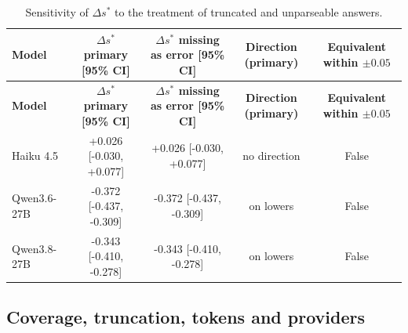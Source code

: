 \documentclass[10pt,a4paper]{article}
\begin{document}
\begin{footnotesize}
\setlength{\tabcolsep}{2pt}
\begin{longtable}{lcccc}
\caption{Sensitivity of $\Delta s^{*}$ to the treatment of truncated and unparseable answers.}\\
\toprule
\textbf{Model} & \textbf{$\Delta s^{*}$ primary [95\% CI]} & \textbf{$\Delta s^{*}$ missing as error [95\% CI]} & \textbf{Direction (primary)} & \textbf{Equivalent within $\pm0.05$} \\
\midrule
\endfirsthead
\toprule
\textbf{Model} & \textbf{$\Delta s^{*}$ primary [95\% CI]} & \textbf{$\Delta s^{*}$ missing as error [95\% CI]} & \textbf{Direction (primary)} & \textbf{Equivalent within $\pm0.05$} \\
\midrule
\endhead
\bottomrule
\endfoot
Haiku 4.5 & +0.026 [-0.030, +0.077] & +0.026 [-0.030, +0.077] & no direction & False \\
Qwen3.6-27B & -0.372 [-0.437, -0.309] & -0.372 [-0.437, -0.309] & on lowers & False \\
Qwen3.8-27B & -0.343 [-0.410, -0.278] & -0.343 [-0.410, -0.278] & on lowers & False \\
\end{longtable}
\end{footnotesize}

\subsection{Coverage, truncation, tokens and providers}
\end{document}
